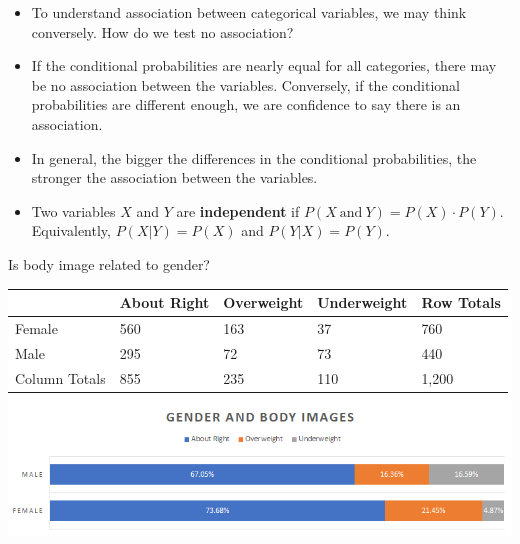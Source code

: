 \begin{itemize}
\item
  To understand association between categorical variables, we may think
  conversely. How do we test no association?
\item
  If the conditional probabilities are nearly equal for all categories,
  there may be no association between the variables. Conversely, if the
  conditional probabilities are different enough, we are confidence to
  say there is an association.
\item
  In general, the bigger the differences in the conditional
  probabilities, the stronger the association between the variables.
\item
  Two variables \(X\) and \(Y\) are \textbf{independent} if
  \(P(X~\text{and}~Y)=P(X)\cdot P(Y)\). Equivalently, \(P(X|Y)=P(X)\)
  and \(P(Y|X)=P(Y)\).
\end{itemize}

\begin{example}

Is body image related to gender?

\begin{fullwidth}
  \colorbox{white}{
    \parbox{\linewidth}{
\centering
\begin{tabular}[c]{*{5}{l}}
  \hline
  \multicolumn{1}{c}{\textbf{}} & 
  \multicolumn{1}{c}{\textbf{About Right}} & 
  \multicolumn{1}{c}{\textbf{Overweight}} &
  \multicolumn{1}{c}{\textbf{Underweight}} &
  \multicolumn{1}{c}{\textbf{Row Totals}} \\
  \hline
  Female & 560 &
163 & 37 & 760 \\
Male &
295 & 72 & 73 & 440 \\
Column Totals & 855 & 235 & 110 &
1,200\\       
  \hline
\end{tabular}

  \includegraphics[width=0.9\linewidth]{Figures/Gender-Body.png}
  }}
\end{fullwidth}

\end{example}
\vspace*{\baselineskip}

